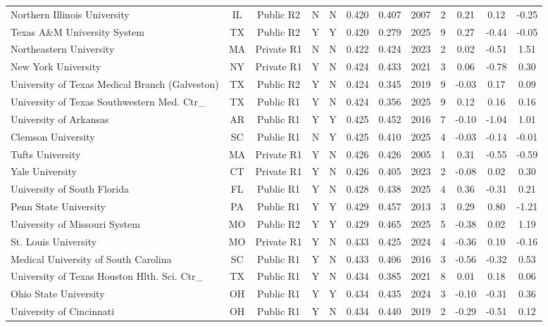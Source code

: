 \begin{longtable}{@{}p{3.55cm}ccccccccccc@{}}
Northern Illinois University & IL & Public R2 & N & N & 0.420 & 0.407 & 2007 & 2 & 0.21 & 0.12 & -0.25 \\
Texas A\&M University System & TX & Public R2 & Y & Y & 0.420 & 0.279 & 2025 & 9 & 0.27 & -0.44 & -0.05 \\
Northeastern University & MA & Private R1 & N & N & 0.422 & 0.424 & 2023 & 2 & 0.02 & -0.51 & 1.51 \\
New York University & NY & Private R1 & Y & N & 0.424 & 0.433 & 2021 & 3 & 0.06 & -0.78 & 0.30 \\
University of Texas Medical Branch (Galveston) & TX & Public R2 & Y & N & 0.424 & 0.345 & 2019 & 9 & -0.03 & 0.17 & 0.09 \\
University of Texas Southwestern Med. Ctr\_ & TX & Public R1 & Y & N & 0.424 & 0.356 & 2025 & 9 & 0.12 & 0.16 & 0.16 \\
University of Arkansas & AR & Public R1 & Y & Y & 0.425 & 0.452 & 2016 & 7 & -0.10 & -1.04 & 1.01 \\
Clemson University & SC & Public R1 & N & Y & 0.425 & 0.410 & 2025 & 4 & -0.03 & -0.14 & -0.01 \\
Tufts University & MA & Private R1 & Y & N & 0.426 & 0.426 & 2005 & 1 & 0.31 & -0.55 & -0.59 \\
Yale University & CT & Private R1 & Y & N & 0.426 & 0.405 & 2023 & 2 & -0.08 & 0.02 & 0.30 \\
University of South Florida & FL & Public R1 & Y & N & 0.428 & 0.438 & 2025 & 4 & 0.36 & -0.31 & 0.21 \\
Penn State University & PA & Public R1 & Y & Y & 0.429 & 0.457 & 2013 & 3 & 0.29 & 0.80 & -1.21 \\
University of Missouri System & MO & Public R2 & Y & Y & 0.429 & 0.465 & 2025 & 5 & -0.38 & 0.02 & 1.19 \\
St. Louis University & MO & Private R1 & Y & N & 0.433 & 0.425 & 2024 & 4 & -0.36 & 0.10 & -0.16 \\
Medical University of South Carolina & SC & Public R1 & Y & N & 0.433 & 0.406 & 2016 & 3 & -0.56 & -0.32 & 0.53 \\
University of Texas Houston Hlth. Sci. Ctr\_ & TX & Public R1 & Y & N & 0.434 & 0.385 & 2021 & 8 & 0.01 & 0.18 & 0.06 \\
Ohio State University & OH & Public R1 & Y & Y & 0.434 & 0.435 & 2024 & 3 & -0.10 & -0.31 & 0.36 \\
University of Cincinnati & OH & Public R1 & Y & N & 0.434 & 0.440 & 2019 & 2 & -0.29 & -0.51 & 0.12 \\

\end{longtable}
